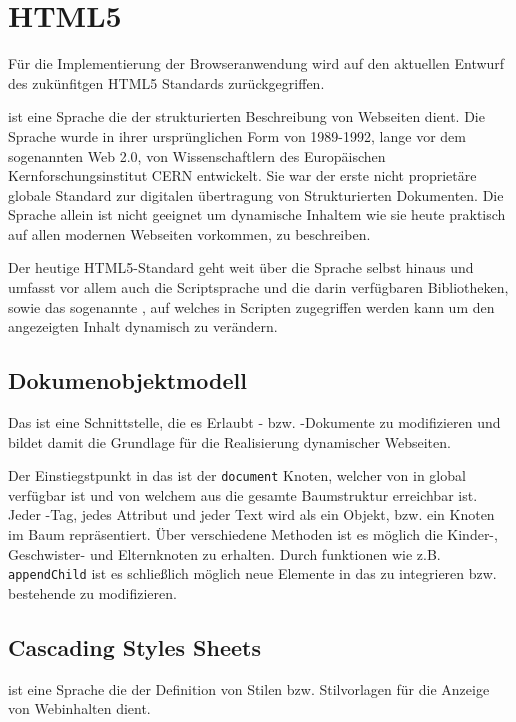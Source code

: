 \section{HTML5}

Für die Implementierung der Browseranwendung wird auf den aktuellen Entwurf des  zukünfitgen HTML5
Standards zurückgegriffen. \cite{html5}

 ist eine Sprache die der strukturierten  Beschreibung von Webseiten dient. Die Sprache
wurde in ihrer ursprünglichen Form  von 1989-1992, lange vor dem sogenannten Web 2.0, von
Wissenschaftlern des  Europäischen Kernforschungsinstitut CERN entwickelt. Sie war der erste nicht
proprietäre globale Standard zur digitalen übertragung von Strukturierten  Dokumenten. Die Sprache
 allein ist nicht geeignet um dynamische Inhaltem  wie sie heute praktisch auf allen
modernen Webseiten vorkommen, zu beschreiben.

Der heutige HTML5-Standard geht weit über die Sprache  selbst hinaus und  umfasst vor
allem auch die Scriptsprache  und die darin verfügbaren  Bibliotheken, sowie das
sogenannte , auf welches in  Scripten zugegriffen werden kann um den angezeigten Inhalt
dynamisch zu  verändern.

\subsection{Dokumenobjektmodell}

Das  ist eine Schnittstelle, die es Erlaubt - bzw. -Dokumente zu
modifizieren und bildet damit die Grundlage für die Realisierung dynamischer Webseiten.

Der Einstiegstpunkt in das  ist der \texttt{document} Knoten, welcher von in 
global verfügbar ist und von welchem aus die gesamte Baumstruktur erreichbar ist. Jeder
-Tag, jedes Attribut und jeder Text wird als ein Objekt, bzw. ein Knoten im Baum
repräsentiert. Über verschiedene Methoden ist es möglich die Kinder-, Geschwister- und Elternknoten
zu erhalten. Durch funktionen wie z.B. \texttt{appendChild} ist es schließlich möglich neue Elemente
in das  zu integrieren bzw. bestehende zu modifizieren. \cite{dom}

\subsection{Cascading Styles Sheets}

 ist eine Sprache die der Definition von  Stilen bzw. Stilvorlagen für die Anzeige von
Webinhalten dient.

